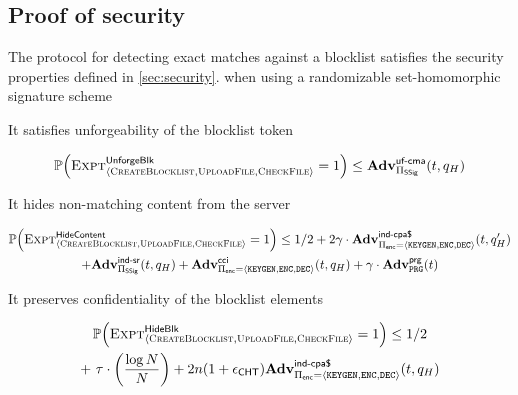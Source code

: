 \subsection{Proof of security \protocolFMP}
\label{sec:proof:fmp}
%
\begin{theorem}
	
	The protocol \protocolFMP for detecting exact matches against a blocklist satisfies the security properties defined in \ref{sec:security}.
when using a randomizable set-homomorphic signature scheme \ourSigSchemeDefn 

\enumListStart
	
	\item It satisfies unforgeability of the blocklist token 
	\begin{small}
	\begin{gather*}
    \mathbb{P}\mathopen{}\left({\textsc{Expt}^{\mathsf{UnforgeBlk}}_{\langle \textsc{CreateBlocklist}, \textsc{UploadFile}, \textsc{CheckFile} \rangle} = 1}\right)\mathclose{} \le \mathbf{Adv}^{\scriptsize\textsf{uf-cma}}_{\Pi_{\mathsf{SSig}} }(t, q_H)
\end{gather*}
	\end{small}
	
	\item It hides non-matching content from the server 
	
	\begin{small}
					\begin{gather*}
			\prob{\hidingContentExp = 1} \le 1/2 + 2 \numProjections \cdot \Advantage{\indcpaRandLabel}{\encryptionSchemeDefn}(\timeBound, 
		\oracleQueries') \\  + \indsrAdv +  \Advantage{\cciLabel}{\encryptionSchemeDefn}(\timeBound, \oracleQueries)  + \numProjections \cdot \Advantage{\prgLabel}{\prg}(\timeBound)
		\end{gather*}
		\end{small}
	
	\item It preserves confidentiality of the blocklist elements
	
	\begin{small}
				\begin{gather*}
				\prob{\hidingBlocklistExp = 1} \le 1/2  \\ + ~\numBlocklistParts \cdot \left(\frac{\log \rsaMod}{\rsaMod}\right) + 2 \blocklistSize (1 +  \cuckooTableParam)\Advantage{\indcpaRandLabel}{\encryptionSchemeDefn}(\timeBound, \oracleQueries)
			\end{gather*}
		\end{small}
	
	\enumListEnd  


\end{theorem}



